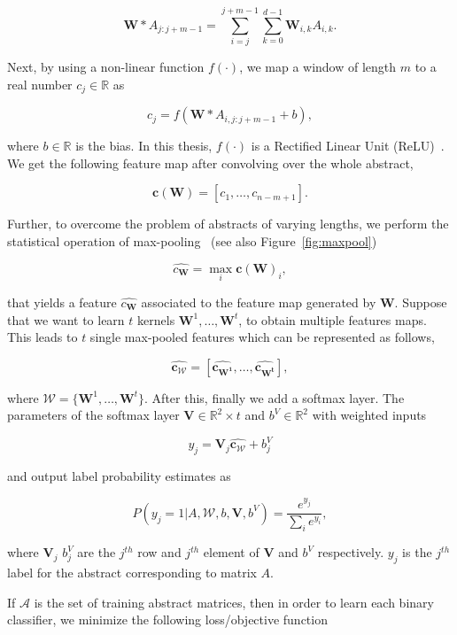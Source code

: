 \begin{center}
\[\mathbf{W} * A_{j:j+m-1} = \sum_{i=j}^{j+m-1} \sum_{k=0}^{d-1} \mathbf{W}_{i,k} A_{i,k}.
\]
\end{center}

Next, by using a non-linear function $f(\cdot)$, we map a window of length $m$ to a real number $c_j \in \mathbb{R}$ as 

\[c_j = f(\mathbf{W} * A_{i, j:j+m-1} + b),
\]
 
 where $b \in \mathbb{R}$ is the bias. In this thesis, $f(\cdot)$ is a Rectified Linear Unit (ReLU)~\cite{glorot2011deep, nair2010rectified}. We get the following feature map after convolving over the whole abstract,

 \[\mathbf{c(W)} = [c_1, \ldots, c_{n-m+1}].\]

 Further, to overcome the problem of abstracts of varying lengths, we perform the statistical operation of max-pooling~\cite{zhou1988image} (see also Figure~\ref{fig:maxpool})

 \[\hat{c_{\mathbf{W}}} = \max_{i} \mathbf{c(W)}_i,\]

 that yields a feature $\hat{c_{\mathbf{W}}}$ associated to the feature map generated by $\mathbf{W}$. Suppose that we want to learn $t$ kernels $\mathbf{W}^1, \ldots, \mathbf{W}^t$, to obtain multiple features maps. This leads to $t$ single max-pooled features which can be represented as follows,

 \[ \mathbf{\hat{c_{\mathcal{W}}}} = [\mathbf{\hat{c_{\mathbf{W}^1}}}, \ldots, \mathbf{\hat{c_{\mathbf{W}^t}}}],
 \]

 where $\mathcal{W} = \{\mathbf{W}^1, \ldots, \mathbf{W}^t\}$. After this, finally we add a softmax layer. The parameters of the softmax layer $\mathbf{V} \in \mathbb{R}^2 \times t$ and $b^{V} \in \mathbb{R}^2$ with weighted inputs 

 \[y_j = \mathbf{V}_j \mathbf{\hat{c_{\mathcal{W}}}} + b^{V}_j\]

and output label probability estimates as

\[P(y_j = 1 | A, \mathcal{W}, b, \mathbf{V}, b^{V}) = \frac{e^{y_j}}{\sum_i e^{y_i}},\]

where $\mathbf{V}_j$ $b^{V}_j$ are the $j^{th}$ row and $j^{th}$ element of $\mathbf{V}$ and $b^{V}$ respectively. $y_j$ is the $j^{th}$ label for the abstract corresponding to matrix $A$. 

If $\mathcal{A}$ is the set of training abstract matrices, then in order to learn each binary classifier, we minimize the following loss/objective function

